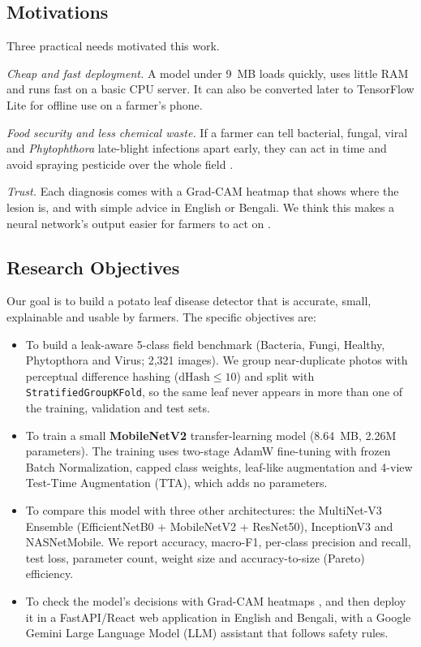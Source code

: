 \subsection{Motivations}
Three practical needs motivated this work.

\textit{Cheap and fast deployment.} A model under 9~MB loads quickly, uses little RAM and runs fast on a basic CPU server. It can also be converted later to TensorFlow Lite for offline use on a farmer's phone.

\textit{Food security and less chemical waste.} If a farmer can tell bacterial, fungal, viral and \textit{Phytophthora} late-blight infections apart early, they can act in time and avoid spraying pesticide over the whole field \cite{fao2017future, savary2019global}.

\textit{Trust.} Each diagnosis comes with a Grad-CAM heatmap that shows where the lesion is, and with simple advice in English or Bengali. We think this makes a neural network's output easier for farmers to act on \cite{ryo2022explainable}.

\subsection{Research Objectives}
Our goal is to build a potato leaf disease detector that is accurate, small, explainable and usable by farmers. The specific objectives are:
\begin{itemize}
    \item To build a leak-aware 5-class field benchmark (Bacteria, Fungi, Healthy, Phytopthora and Virus; 2,321 images). We group near-duplicate photos with perceptual difference hashing ($\text{dHash} \le 10$) and split with \texttt{StratifiedGroupKFold}, so the same leaf never appears in more than one of the training, validation and test sets.
    \item To train a small \textbf{MobileNetV2} transfer-learning model (8.64~MB, 2.26M parameters). The training uses two-stage AdamW fine-tuning with frozen Batch Normalization, capped class weights, leaf-like augmentation and 4-view Test-Time Augmentation (TTA), which adds no parameters.
    \item To compare this model with three other architectures: the MultiNet-V3 Ensemble (EfficientNetB0 + MobileNetV2 + ResNet50), InceptionV3 and NASNetMobile. We report accuracy, macro-F1, per-class precision and recall, test loss, parameter count, weight size and accuracy-to-size (Pareto) efficiency.
    \item To check the model's decisions with Grad-CAM heatmaps \cite{selvaraju2017grad}, and then deploy it in a FastAPI/React web application in English and Bengali, with a Google Gemini Large Language Model (LLM) assistant that follows safety rules.
\end{itemize}

